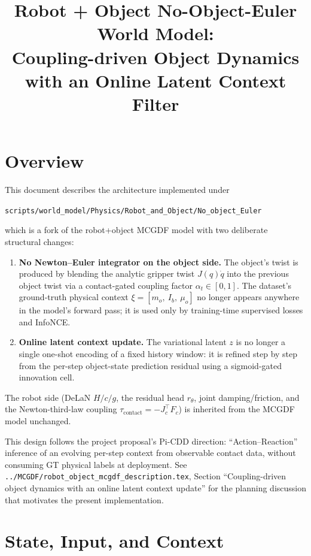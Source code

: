 \documentclass[11pt]{article}
\title{Robot + Object No-Object-Euler World Model:\\Coupling-driven Object Dynamics with an Online Latent Context Filter}
\author{}
\date{}
\begin{document}
\maketitle

\section{Overview}

This document describes the architecture implemented under
\begin{center}
\texttt{scripts/world\_model/Physics/Robot\_and\_Object/No\_object\_Euler}
\end{center}
which is a fork of the robot+object MCGDF model with two deliberate
structural changes:
\begin{enumerate}
  \item \textbf{No Newton--Euler integrator on the object side.}  The
    object's twist is produced by blending the analytic gripper twist
    $J(q)\dot q$ into the previous object twist via a contact-gated
    coupling factor $\alpha_t \in [0,1]$.  The dataset's ground-truth
    physical context $\xi = [m_o,\ I_b,\ \mu_o]$ no longer appears
    anywhere in the model's forward pass; it is used only by
    training-time supervised losses and InfoNCE.
  \item \textbf{Online latent context update.}  The variational latent
    $z$ is no longer a single one-shot encoding of a fixed history
    window: it is refined step by step from the per-step object-state
    prediction residual using a sigmoid-gated innovation cell.
\end{enumerate}
The robot side (DeLaN $H/c/g$, the residual head $r_\theta$, joint
damping/friction, and the Newton-third-law coupling
$\tau_{\mathrm{contact}} = -J_c^\top F_c$) is inherited from the MCGDF
model unchanged.

This design follows the project proposal's Pi-CDD direction:
``Action--Reaction'' inference of an evolving per-step context from
observable contact data, without consuming GT physical labels at
deployment.  See
\texttt{../MCGDF/robot\_object\_mcgdf\_description.tex},
Section ``Coupling-driven object dynamics with an online latent
context update'' for the planning discussion that motivates the
present implementation.

\section{State, Input, and Context}
\end{document}
